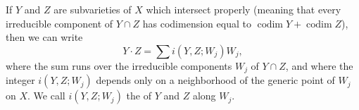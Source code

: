 If $Y$ and $Z$ are subvarieties of $X$ which intersect properly (meaning that every irreducible component of $Y \cap Z$ has codimension equal to $\operatorname{codim} Y + \operatorname{codim} Z$), then we can write
$$Y \cdot Z = \sum i(Y,Z; W_j) W_j,$$
where the sum runs over the irreducible components $W_j$ of $Y \cap Z$, and where the integer $i(Y,Z; W_j)$ depends only on a neighborhood of the generic point of $W_j$ on $X$. We call $i(Y,Z; W_j)$ the  of $Y$ and $Z$ along $W_j$.
